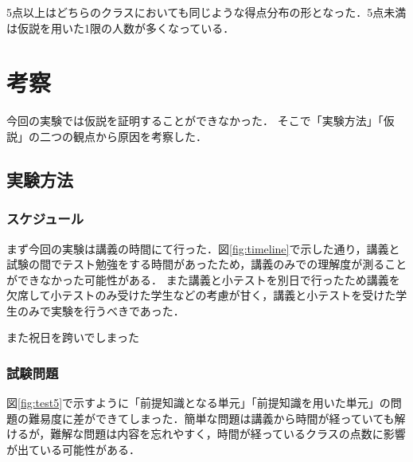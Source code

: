 \documentclass[a4j,12pt]{jsarticle}
\begin{document}
\begin{table}[H]
\centering
{}
\caption{小テスト全体の平均点の比較}
\label{fig:12ank}
\end{table}

5点以上はどちらのクラスにおいても同じような得点分布の形となった．5点未満は仮説を用いた1限の人数が多くなっている．
 


\newpage
\section{考察}
今回の実験では仮説を証明することができなかった．
そこで「実験方法」「仮説」の二つの観点から原因を考察した．

\subsection{実験方法}
\subsubsection{スケジュール}
まず今回の実験は講義の時間にて行った．図\ref{fig:timeline}で示した通り，講義と試験の間でテスト勉強をする時間があったため，講義のみでの理解度が測ることができなかった可能性がある．
また講義と小テストを別日で行ったため講義を欠席して小テストのみ受けた学生などの考慮が甘く，講義と小テストを受けた学生のみで実験を行うべきであった．

また祝日を跨いでしまった

\subsubsection{試験問題}

図\ref{fig:test5}で示すように「前提知識となる単元」「前提知識を用いた単元」の問題の難易度に差ができてしまった．簡単な問題は講義から時間が経っていても解けるが，難解な問題は内容を忘れやすく，時間が経っているクラスの点数に影響が出ている可能性がある．
\end{document}
